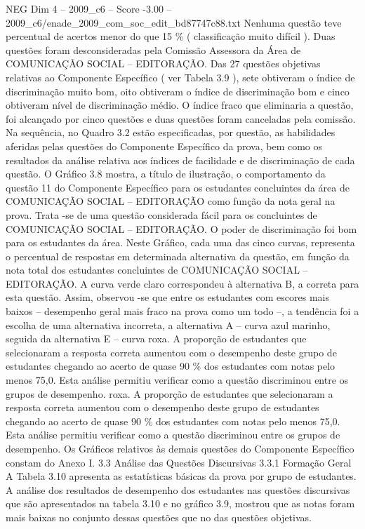 \begin{textsample}{NEG Dim 4 – 2009\_c6 – Score -3.00 – 2009\_c6/enade\_2009\_com\_soc\_edit\_bd87747c88.txt}
Nenhuma questão teve percentual de acertos menor do que 15 \% ( classificação muito difícil ).
Duas questões foram desconsideradas pela Comissão Assessora da Área de COMUNICAÇÃO SOCIAL – EDITORAÇÃO.
Das 27 questões objetivas relativas ao Componente Específico ( ver Tabela 3.9 ), sete obtiveram o índice de discriminação muito bom, oito obtiveram o índice de discriminação bom e cinco obtiveram nível de discriminação médio.
O índice fraco que eliminaria a questão, foi alcançado por cinco questões e duas questões foram canceladas pela comissão.
Na sequência, no Quadro 3.2 estão especificadas, por questão, as habilidades aferidas pelas questões do Componente Específico da prova, bem como os resultados da análise relativa aos índices de facilidade e de discriminação de cada questão.
O Gráfico 3.8 mostra, a título de ilustração, o comportamento da questão 11 do Componente Específico para os estudantes concluintes da área de COMUNICAÇÃO SOCIAL – EDITORAÇÃO como função da nota geral na prova.
Trata -se de uma questão considerada fácil para os concluintes de COMUNICAÇÃO SOCIAL – EDITORAÇÃO.
O poder de discriminação foi bom para os estudantes da área.
Neste Gráfico, cada uma das cinco curvas, representa o percentual de respostas em determinada alternativa da questão, em função da nota total dos estudantes concluintes de COMUNICAÇÃO SOCIAL – EDITORAÇÃO.
A curva verde claro correspondeu à alternativa B, a correta para esta questão.
Assim, observou -se que entre os estudantes com escores mais baixos – desempenho geral mais fraco na prova como um todo –, a tendência foi a escolha de uma alternativa incorreta, a alternativa A – curva azul marinho, seguida da alternativa E – curva roxa.
A proporção de estudantes que selecionaram a resposta correta aumentou com o desempenho deste grupo de estudantes chegando ao acerto de quase 90 \% dos estudantes com notas pelo menos 75,0.
Esta análise permitiu verificar como a questão discriminou entre os grupos de desempenho. roxa.
A proporção de estudantes que selecionaram a resposta correta aumentou com o desempenho deste grupo de estudantes chegando ao acerto de quase 90 \% dos estudantes com notas pelo menos 75,0.
Esta análise permitiu verificar como a questão discriminou entre os grupos de desempenho.
Os Gráficos relativos às demais questões do Componente Específico constam do Anexo I. 3.3 Análise das Questões Discursivas 3.3.1 Formação Geral A Tabela 3.10 apresenta as estatísticas básicas da prova por grupo de estudantes.
A análise dos resultados de desempenho dos estudantes nas questões discursivas que são apresentados na tabela 3.10 e no gráfico 3.9, mostrou que as notas foram mais baixas no conjunto dessas questões que no das questões objetivas.

\end{textsample}
